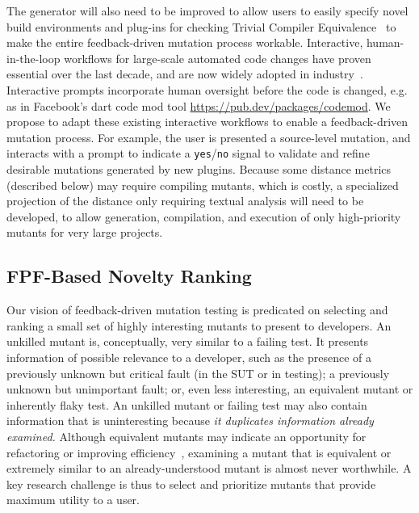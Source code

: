 The generator will also need to be improved to allow users to easily specify
novel build environments and plug-ins for checking Trivial Compiler
Equivalence~\cite{TCE} to make the entire feedback-driven mutation process
workable. Interactive, human-in-the-loop workflows for large-scale automated
code changes have proven essential over the last decade, and are now widely
adopted in industry~\cite{codemod-gh,
  codemod-fb-post-by-codemod-author, dart-codemod}. Interactive
prompts incorporate human oversight before the code is changed,
e.g. as in Facebook's dart code mod tool \url{https://pub.dev/packages/codemod}. 
We propose to adapt these existing interactive workflows to enable a
feedback-driven mutation process. For example, the user is presented a source-level mutation, and interacts with a prompt to indicate a {\tt yes}/{\tt no} signal
to validate and refine desirable mutations generated by new plugins.
 Because some distance
metrics (described below) may require compiling mutants, which is costly, a specialized
projection of the distance only requiring textual analysis will need
to be developed, to allow generation, compilation, and execution of
only high-priority mutants for very large projects.


\subsection{FPF-Based Novelty Ranking}
\label{sec:fpfplan}


Our vision of feedback-driven mutation testing is predicated on selecting and ranking a small
set of highly interesting mutants to present to developers.  An unkilled
mutant is, conceptually, very similar to a failing test.  It presents
information of possible relevance to a developer, such as the
presence of a previously unknown but critical fault (in the SUT or in testing);
a previously unknown but unimportant fault; or, even less interesting, an
equivalent mutant or inherently flaky test. An
unkilled mutant or failing test may also contain information that is uninteresting
because \emph{it duplicates information already examined.} Although equivalent mutants 
may indicate an opportunity
for refactoring or improving efficiency~\cite{ivankovic2018industrial,groce2018verified}, examining a mutant that
is equivalent or extremely similar to an already-understood mutant is
almost never worthwhile.  A key research challenge is thus to select and
prioritize mutants that provide maximum utility to a user.

